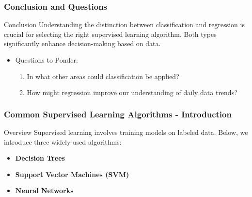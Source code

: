 \documentclass[aspectratio=169]{beamer}
\begin{document}
\begin{frame}[fragile]
    \frametitle{Conclusion and Questions}
    \begin{block}{Conclusion}
        Understanding the distinction between classification and regression is crucial for selecting the right supervised learning algorithm. Both types significantly enhance decision-making based on data.
    \end{block}
    \begin{itemize}
        \item Questions to Ponder:
            \begin{enumerate}
                \item In what other areas could classification be applied?
                \item How might regression improve our understanding of daily data trends?
            \end{enumerate}
    \end{itemize}
\end{frame}

\begin{frame}[fragile]
    \frametitle{Common Supervised Learning Algorithms - Introduction}
    \begin{block}{Overview}
        Supervised learning involves training models on labeled data. 
        Below, we introduce three widely-used algorithms:
        \begin{itemize}
            \item \textbf{Decision Trees}
            \item \textbf{Support Vector Machines (SVM)}
            \item \textbf{Neural Networks}
        \end{itemize}
    \end{block}
\end{frame}
\end{document}
